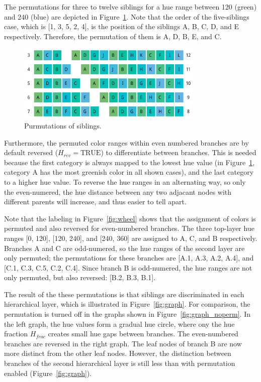 \documentclass[journal]{vgtc}                %
\begin{document}
The permutations for three to twelve siblings for a hue range between 120 (green) and 240 (blue) are depicted in Figure~\ref{fig:perm}. Note that the order of the five-siblings case, which is [1, 3, 5, 2, 4], is the position of the siblings A, B, C, D, and E respectively. Therefore, the permutation of them is A, D, B, E, and C. 

\begin{figure}[htb]
  \centering
  \includegraphics[width=3.5in]{Permutations.pdf}
  \caption{Purmutations of siblings.}\label{fig:perm}
\end{figure}


Furthermore, the permuted color ranges within even numbered branches are by default reversed ($H_{rev}=\mbox{TRUE}$) to differentiate between branches. This is needed because the first category is always mapped to the lowest hue value (in Figure~\ref{fig:perm}, category A has the most greenish color in all shown cases), and the last category to a higher hue value. To reverse the hue ranges in an alternating way, so only the even-numered, the hue distance between any two adjacant nodes with different parents will increase, and thus easier to tell apart. 

Note that the labeling in Figure~\ref{fig:wheel} shows that the assignment of colors is permuted and also reversed for even-numbered branches. The three top-layer hue ranges [0, 120], [120, 240], and [240, 360] are assigned to A, C, and B respectively. Branches A and C are odd-numered, so the hue ranges of the second layer are only permuted; the permutations for these branches are [A.1, A.3, A.2, A.4], and [C.1, C.3, C.5, C.2, C.4]. Since branch B is odd-numered, the hue ranges are not only permuted, but also reversed: [B.2, B.3, B.1].

The result of the these permutations is that siblings are discriminated in each hierarchical layer, which is illustrated in Figure~\ref{fig:graph}. For comparison, the permutation is turned off in the graphs shown in Figure~\ref{fig:graph_noperm}. In the left graph, the hue values form a gradual hue circle, where ony the hue fraction $H_{frac}$ creates small hue gaps between branches. The even-numbered branches are reversed in the right graph. The leaf nodes of branch B are now more distinct from the other leaf nodes. However, the distinction between branches of the second hierarchical layer is still less than with permutation enabled (Figure~\ref{fig:graph}).
\end{document}
